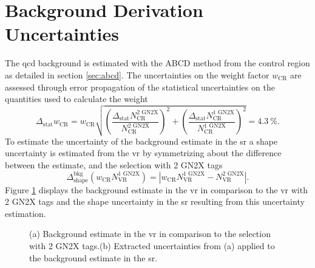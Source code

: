 \section{Background Derivation Uncertainties}\label{sec:bkg_uncertainties}
The \ac{qcd} background is estimated with the ABCD method from the control region as detailed in section \ref{sec:abcd}. The uncertainties on the weight factor $w_\text{CR}$ are assessed through error propagation of the statistical uncertainties on the quantities used to calculate the weight
\begin{equation}
    \Delta_\text{stat} w_\text{CR} = w_\text{CR} \sqrt{
        \left(\frac{\Delta_\text{stat} N_\text{CR}^\text{2 GN2X}}{N_\text{CR}^\text{2 GN2X}}\right)^2
        +
        \left(\frac{\Delta_\text{stat} N_\text{CR}^\text{1 GN2X}}{N_\text{CR}^\text{1 GN2X}}\right)^2
    }
    = \qty[]{4.3}{\percent}.
\end{equation}
To estimate the uncertainty of the background estimate in the \ac{sr} a shape uncertainty is estimated from the \ac{vr} by symmetrizing about the difference between the estimate, and the selection with 2 GN2X tags
\begin{equation}
    \Delta_\text{shape}^\text{bkg} \left( w_\text{CR}N_\text{VR}^\text{1 GN2X}\right)= \left| w_\text{CR}N_\text{VR}^\text{1 GN2X} - N_\text{VR}^\text{2 GN2X}\right|.
\end{equation}
Figure \ref{fig:bkg_shape_estimate} displays the background estimate in the \ac{vr} in comparison to the \ac{vr} with 2 GN2X tags and the shape uncertainty in the \ac{sr} resulting from this uncertainty estimation.
\begin{figure}
    \centering
    \caption[]{(a) Background estimate in the \ac{vr} in comparison to the selection with 2 GN2X tags.(b) Extracted uncertainties from (a) applied to the background estimate in the \ac{sr}.}
    \label{fig:bkg_shape_estimate}
\end{figure}

